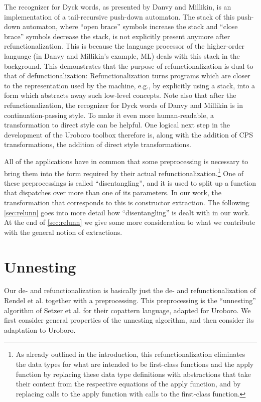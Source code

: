 The recognizer for Dyck words, as presented by Danvy and Millikin, is an implementation of a tail-recursive push-down automaton. The stack of this push-down automaton, where ``open brace'' symbols increase the stack and ``close brace'' symbols decrease the stack, is not explicitly present anymore after refunctionalization. This is because the language processor of the higher-order language (in Danvy and Millikin's example, ML) deals with this stack in the background. This demonstrates that the purpose of refunctionalization is dual to that of defunctionalization: Refunctionalization turns programs which are closer to the representation used by the machine, e.g., by explicitly using a stack, into a form which abstracts away such low-level concepts. Note also that after the refunctionalization, the recognizer for Dyck words of Danvy and Millikin is in continuation-passing style. To make it even more human-readable, a transformation to direct style can be helpful. One logical next step in the development of the Uroboro toolbox therefore is, along with the addition of CPS transformations, the addition of direct style transformations.

All of the applications have in common that some preprocessing is necessary to bring them into the form required by their actual refunctionalization.\footnote{As already outlined in the introduction, this refunctionalization eliminates the data types for what are intended to be first-class functions and the apply function by replacing these data type definitions with abstractions that take their content from the respective equations of the apply function, and by replacing calls to the apply function with calls to the first-class function.} One of these preprocessings is called ``disentangling'', and it is used to split up a function that dispatches over more than one of its parameters. In our work, the transformation that corresponds to this is constructor extraction. The following \autoref{sec:relunn} goes into more detail how ``disentangling'' is dealt with in our work. At the end of \autoref{sec:relunn} we give some more consideration to what we contribute with the general notion of extractions.

\section{Unnesting}
\label{sec:relunn}

Our de- and refunctionalization is basically just the de- and refunctionalization of Rendel et al.\cite{rendel15automatic} together with a preprocessing. This preprocessing is the ``unnesting'' algorithm of Setzer et al.\cite{setzer14unnesting} for their copattern language, adapted for Uroboro. We first consider general properties of the unnesting algorithm, and then consider its adaptation to Uroboro.

